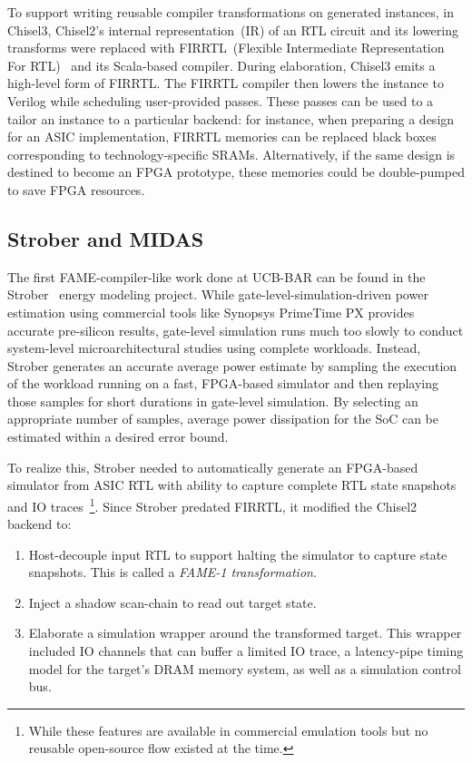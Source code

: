 To support writing reusable compiler transformations on generated instances, in
Chisel3, Chisel2's internal representation~(IR) of an RTL circuit and its
lowering transforms were replaced with FIRRTL~(Flexible Intermediate
Representation For RTL)~\cite{FIRRTL} and its Scala-based compiler. During
elaboration, Chisel3 emits a high-level form of FIRRTL. The FIRRTL compiler
then lowers the instance to Verilog while scheduling user-provided passes. These passes can be used to
a tailor an instance to a particular backend: for instance, when preparing a
design for an ASIC implementation, FIRRTL memories can be replaced
black boxes corresponding to technology-specific SRAMs. Alternatively, if the same
design is destined to become an FPGA prototype, these memories could be double-pumped
to save FPGA resources.

\subsection{Strober and MIDAS}\label{sec:midas-intro}

The first FAME-compiler-like work done at UCB-BAR can be found in the
Strober~\cite{Strober} energy modeling project. While
gate-level-simulation-driven power estimation using commercial tools like
Synopsys PrimeTime PX provides accurate pre-silicon results, gate-level
simulation runs much too slowly to conduct system-level microarchitectural studies using
complete workloads. Instead, Strober generates an accurate average power
estimate by sampling the execution of the workload running on a fast,
FPGA-based simulator and then replaying those samples for short durations in
gate-level simulation. By selecting an appropriate number of samples, average
power dissipation for the SoC can be estimated within a desired error bound.

To realize this, Strober needed to automatically generate an FPGA-based
simulator from ASIC RTL with ability to capture complete RTL state snapshots
and IO traces~\footnote{While these features are available in commercial
emulation tools but no reusable open-source flow existed at the time.}.
Since Strober predated FIRRTL, it modified the Chisel2 backend to:
\begin{enumerate}
    \item Host-decouple input RTL to support halting the simulator to capture
        state snapshots. This is called a \emph{FAME-1 transformation}.
    \item Inject a shadow scan-chain to read out target state.
    \item Elaborate a simulation wrapper around the transformed target. This
        wrapper included IO channels that can buffer a limited IO trace, a
        latency-pipe timing model for the target's DRAM memory system, as well
        as a simulation control bus.
\end{enumerate}

